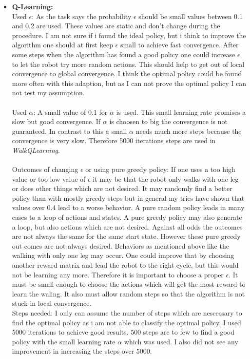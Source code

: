 \documentclass[conference]{IEEEtran}
\begin{document}
\begin{itemize}
\item \textbf{Q-Learning:}\\
Used $\epsilon$: As the task says the probability $\epsilon$ should be small values between 0.1 and 0.2 are used. These values are static and don't change during the procedure. I am not sure if i found the ideal policy, but i think to improve the algorithm one should at first keep $\epsilon$ small to achieve fast convergence. After some steps when the algorithm has found a good policy one could increase $\epsilon$ to let the robot try more random actions. This should help to get out of local convergence to global convergence. I think the optimal policy could be found more often with this adaption, but as I can not prove the optimal policy I can not test my assumption.\\
\\
Used $\alpha$: A small value of 0.1 for $\alpha$ is used. This small learning rate promises a slow but good convergence. If $\alpha$ is choosen to big the convergence is not guaranteed. In contrast to this a small $\alpha$ needs much more steps because the convergence is very slow. Therefore 5000 iterations steps are used in \textit{WalkQLearning}. \\
\\
Outcomes of changing $\epsilon$ or using pure greedy policy: If one uses a too high value or too low value of $\epsilon$ it may be that the robot only walks with one leg or does other things which are not desired. It may randomly find a better policy than with mostly greedy steps but in general my tries have shown that values over 0.4 lead to a worse behavior. A pure random policy leads in many cases to a loop of actions and states. A pure greedy policy may also generate a loop, but also actions which are not desired. Against all odds the outcomes are not always the same for the same start state. However these pure greedy out comes are not always desired. Behaviors as mentioned above like the walking with only one leg may occur. One could improve that by choosing another reward matrix and lead the robot to the right cycle, but this would not be learning any more. Therefore it is important to choose a proper $\epsilon$. It must be small enough to choose the actions which will get the most reward to learn the waling. It also must allow random steps so that the algorithm is not stuck in local convergence.\\

Steps needed: I only can assume the number of steps which are nescessary to find the optimal policy as i am not able to classify the optimal policy. I used 5000 iterations to achieve good results. 500 steps are to few to find a good policy with the small learning rate $\alpha$ which was used. I also did not see any improvement in increasing the steps over 5000. \\


\end{itemize}
\end{document}
